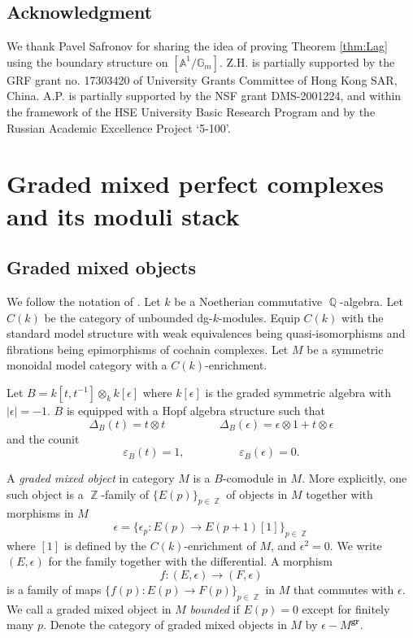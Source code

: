 \documentclass[reqno]{amsart}
\DeclareMathOperator\Z{\mathbb Z}
\DeclareMathOperator\Q{\mathbb Q}
\theoremstyle{definition}
\theoremstyle{remark}
\newcommand{\G}{{\mathbb G}}
\newcommand{\A}{{\mathbb A}}
\newcommand{\ot}{\otimes}
\newcommand{\gr}{\mathbf{gr}}
\newcommand{\ep}{\epsilon}
\numberwithin{equation}{section}
\begin{document}
\subsection{Acknowledgment}
We thank Pavel Safronov for sharing the idea of proving Theorem \ref{thm:Lag} using the boundary structure on $[\A^1\big/\G_m]$.
Z.H. is partially supported by the GRF grant no. 17303420 of University Grants Committee of Hong Kong SAR, China. 
A.P. is partially supported by the NSF grant DMS-2001224, 
and within the framework of the HSE University Basic Research Program and by the Russian Academic Excellence Project `5-100'.

\section{Graded mixed perfect complexes and its moduli stack}\label{sec:prelim}

\subsection{Graded mixed objects}
We follow the notation of \cite[Section 1]{CPTVV}. Let $k$ be a Noetherian commutative $\Q$-algebra. Let $C(k)$ be the category of unbounded dg-$k$-modules. Equip $C(k)$ with the standard model structure with weak equivalences being quasi-isomorphisms and fibrations being epimorphisms of cochain complexes. Let $M$ be a symmetric monoidal model category with a $C(k)$-enrichment.

Let $B=k[t,t^{-1}]\ot_k k[\ep]$ where $k[\ep]$ is the graded symmetric algebra with $|\ep|=-1$. $B$ is equipped with a Hopf algebra structure such that 
\[
\Delta_B(t)=t\ot t\hspace {2cm} \Delta_B(\ep)=\ep\ot 1+t\ot \ep
\] and the counit
\[
\varepsilon_B(t)=1,\hspace{2cm} \varepsilon_B(\ep)=0.
\]
 
A \emph{graded mixed object} in category $M$ is a $B$-comodule in $M$. More explicitly, one such object is a $\Z$-family of $\{E(p)\}_{p\in\Z}$ of objects in $M$ together with morphisms in $M$
\[
\ep=\{\ep_p: E(p)\to E(p+1)[1]\}_{p\in\Z}
\] where $[1]$ is defined by the $C(k)$-enrichment of $M$, and $\ep^2=0$. We write $(E,\ep)$ for the family together with the differential. A morphism 
\[
f: (E,\ep)\to (F,\ep)
\] is a family of maps $\{f(p): E(p)\to F(p)\}_{p\in\Z}$ in $M$ that commutes with $\ep$. We call a graded mixed object in $M$ \emph{bounded} if $E(p)=0$ except for finitely many $p$. Denote the category of graded mixed objects in $M$ by $\ep-M^\gr$. 
\end{document}
